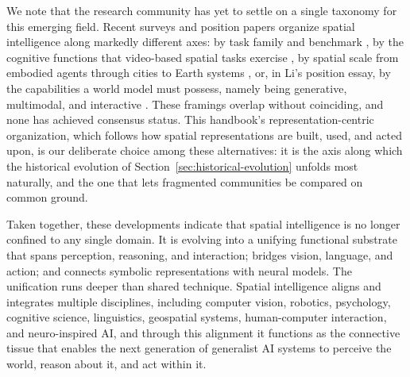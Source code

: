 We note that the research community has yet to settle on a single taxonomy for this emerging field.
Recent surveys and position papers organize spatial intelligence along markedly different axes: by task family and benchmark \cite{chen2024spatialvlm}, by the cognitive functions that video-based spatial tasks exercise \cite{yang2025vsibench}, by spatial scale from embodied agents through cities to Earth systems \cite{feng2025survey}, or, in Li's position essay, by the capabilities a world model must possess, namely being generative, multimodal, and interactive \cite{Feifei2025spatial}.
These framings overlap without coinciding, and none has achieved consensus status.
This handbook's representation-centric organization, which follows how spatial representations are built, used, and acted upon, is our deliberate choice among these alternatives: it is the axis along which the historical evolution of Section~\ref{sec:historical-evolution} unfolds most naturally, and the one that lets fragmented communities be compared on common ground.

Taken together, these developments indicate that spatial intelligence is no longer confined to any single domain.
It is evolving into a unifying functional substrate that spans perception, reasoning, and interaction; bridges vision, language, and action; and connects symbolic representations with neural models.
The unification runs deeper than shared technique.
Spatial intelligence aligns and integrates multiple disciplines, including computer vision, robotics, psychology, cognitive science, linguistics, geospatial systems, human-computer interaction, and neuro-inspired AI, and through this alignment it functions as the connective tissue that enables the next generation of generalist AI systems to perceive the world, reason about it, and act within it.























